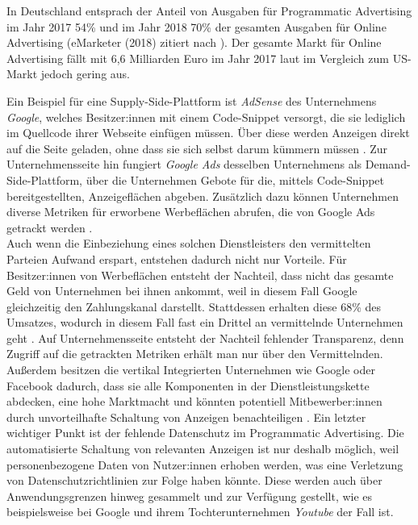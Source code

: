 In Deutschland entsprach der Anteil von Ausgaben für Programmatic Advertising im Jahr 2017 54\% und im Jahr 2018 70\% der gesamten Ausgaben für Online Advertising (eMarketer (2018) zitiert nach \cite[S. 21]{optimity_advisors_2019}). Der gesamte Markt für Online Advertising fällt mit 6,6 Milliarden Euro im Jahr 2017 laut \cite{optimity_advisors_2019} im Vergleich zum US-Markt jedoch gering aus.

Ein Beispiel für eine Supply-Side-Plattform ist \emph{AdSense} des Unternehmens \emph{Google}, welches Besitzer:innen mit einem Code-Snippet versorgt, die sie lediglich im Quellcode ihrer Webseite einfügen müssen. Über diese werden Anzeigen direkt auf die Seite geladen, ohne dass sie sich selbst darum kümmern müssen \cite[]{google_adsense_2021}. Zur Unternehmensseite hin fungiert \emph{Google Ads} desselben Unternehmens als Demand-Side-Plattform, über die Unternehmen Gebote für die, mittels Code-Snippet bereitgestellten, Anzeigeflächen abgeben. 
Zusätzlich dazu können Unternehmen diverse Metriken für erworbene Werbeflächen abrufen, die von Google Ads getrackt werden \cite[]{google_ads_2021}.\\

Auch wenn die Einbeziehung eines solchen Dienstleisters den vermittelten Parteien Aufwand erspart, entstehen dadurch nicht nur Vorteile. 
Für Besitzer:innen von Werbeflächen entsteht der Nachteil, dass nicht das gesamte Geld von Unternehmen bei ihnen ankommt, weil in diesem Fall Google gleichzeitig den Zahlungskanal darstellt. 
Stattdessen erhalten diese 68\% des Umsatzes, wodurch in diesem Fall fast ein Drittel an vermittelnde Unternehmen geht \cite[]{adsense_revenue_2021}. Auf Unternehmensseite entsteht der Nachteil fehlender Transparenz, denn Zugriff auf die getrackten Metriken erhält man nur über den Vermittelnden. Außerdem besitzen die vertikal Integrierten Unternehmen wie Google oder Facebook dadurch, dass sie alle Komponenten in der Dienstleistungskette abdecken, eine hohe Marktmacht und könnten potentiell Mitbewerber:innen durch unvorteilhafte Schaltung von Anzeigen benachteiligen \cite[S. 6]{optimity_advisors_2019}. Ein letzter wichtiger Punkt ist der fehlende Datenschutz im Programmatic Advertising. Die automatisierte Schaltung von relevanten Anzeigen ist nur deshalb möglich, weil personenbezogene Daten von Nutzer:innen erhoben werden, was eine Verletzung von Datenschutzrichtlinien zur Folge haben könnte. Diese werden auch über Anwendungsgrenzen hinweg gesammelt und zur Verfügung gestellt, wie es beispielsweise bei Google und ihrem Tochterunternehmen \emph{Youtube} der Fall ist.

